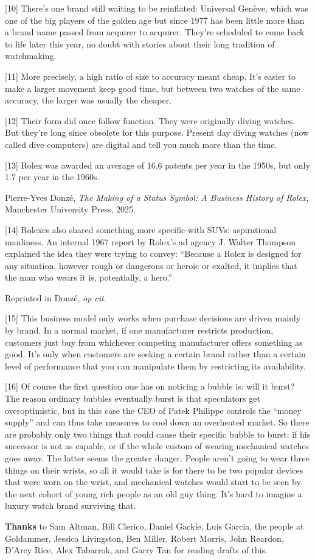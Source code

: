 {[}10{]} There's one brand still waiting to be reinflated: Universal
Genève, which was one of the big players of the golden age but since
1977 has been little more than a brand name passed from acquirer to
acquirer. They're scheduled to come back to life later this year, no
doubt with stories about their long tradition of watchmaking.

{[}11{]} More precisely, a high ratio of size to accuracy meant cheap.
It's easier to make a larger movement keep good time, but between two
watches of the same accuracy, the larger was usually the cheaper.

{[}12{]} Their form did once follow function. They were originally
diving watches. But they're long since obsolete for this purpose.
Present day diving watches (now called dive computers) are digital and
tell you much more than the time.

{[}13{]} Rolex was awarded an average of 16.6 patents per year in the
1950s, but only 1.7 per year in the 1960s.

Pierre-Yves Donzé, \emph{The Making of a Status Symbol: A Business
History of Rolex}, Manchester University Press, 2025.

{[}14{]} Rolexes also shared something more specific with SUVs:
aspirational manliness. An internal 1967 report by Rolex's ad agency J.
Walter Thompson explained the idea they were trying to convey: ``Because
a Rolex is designed for any situation, however rough or dangerous or
heroic or exalted, it implies that the man who wears it is, potentially,
a hero.''

Reprinted in Donzé, \emph{op cit}.

{[}15{]} This business model only works when purchase decisions are
driven mainly by brand. In a normal market, if one manufacturer
restricts production, customers just buy from whichever competing
manufacturer offers something as good. It's only when customers are
seeking a certain brand rather than a certain level of performance that
you can manipulate them by restricting its availability.

{[}16{]} Of course the first question one has on noticing a bubble is:
will it burst? The reason ordinary bubbles eventually burst is that
speculators get overoptimistic, but in this case the CEO of Patek
Philippe controls the ``money supply'' and can thus take measures to
cool down an overheated market. So there are probably only two things
that could cause their specific bubble to burst: if his successor is not
as capable, or if the whole custom of wearing mechanical watches goes
away. The latter seems the greater danger. People aren't going to wear
three things on their wrists, so all it would take is for there to be
two popular devices that were worn on the wrist, and mechanical watches
would start to be seen by the next cohort of young rich people as an old
guy thing. It's hard to imagine a luxury watch brand surviving that.

\textbf{Thanks} to Sam Altman, Bill Clerico, Daniel Gackle, Luis Garcia,
the people at Goldammer, Jessica Livingston, Ben Miller, Robert Morris,
John Reardon, D'Arcy Rice, Alex Tabarrok, and Garry Tan for reading
drafts of this.
